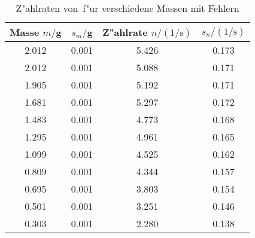 \begin{table}[H]
\caption{Z"ahlraten von \kalium\,f"ur verschiedene Massen mit Fehlern}
\begin{center}
\begin{tabular}{|c|c|c|c|}
  \hline
  Masse $m /$g & $s_m /$g & Z"ahlrate $n / (1/\text{s})$ & $s_n / (1/\text{s})$ \\ \hline 
  2.012 & 0.001 & 5.426 & 0.173 \\ \hline
  2.012 & 0.001 & 5.088 & 0.171 \\ \hline
  1.905 & 0.001 & 5.192 & 0.171 \\ \hline
  1.681 & 0.001 & 5.297 & 0.172 \\ \hline
  1.483 & 0.001 & 4.773 & 0.168 \\ \hline
  1.295 & 0.001 & 4.961 & 0.165 \\ \hline
  1.099 & 0.001 & 4.525 & 0.162 \\ \hline
  0.809 & 0.001 & 4.344 & 0.157 \\ \hline
  0.695 & 0.001 & 3.803 & 0.154 \\ \hline
  0.501 & 0.001 & 3.251 & 0.146 \\ \hline
  0.303 & 0.001 & 2.280 & 0.138 \\ \hline
\end{tabular}
\end{center}
\label{tab:data:kalium}
\end{table}
